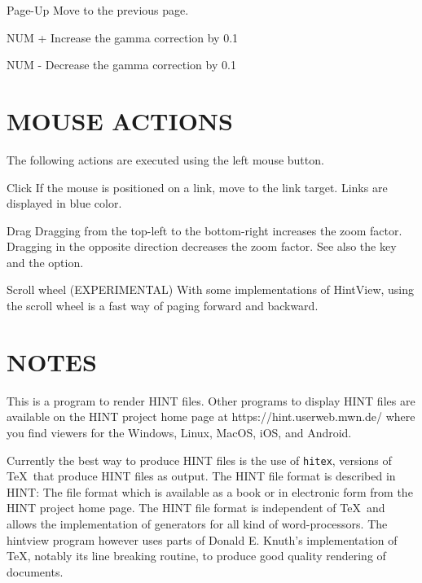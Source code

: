 \item{Page-Up}
              Move to the previous page.

\item{NUM +}  Increase the gamma correction by 0.1

\item{NUM -}  Decrease the gamma correction by 0.1
  
\enditemize


\section{MOUSE ACTIONS}
       The following actions are executed using the left mouse button.

\itemize
         
\item{Click}  If the mouse is positioned on a link, move to the  link  target.
              Links are displayed in blue color.

\item{Drag}   Dragging  from  the  top-left  to the bottom-right increases the
              zoom factor.  Dragging in the opposite direction  decreases  the
              zoom factor. See also the  key and the  option.

\item{Scroll} wheel (EXPERIMENTAL) With some implementations of HintView,
              using the scroll wheel is a fast way of paging forward and backward.
              
\enditemize

              
\section{NOTES}
       This is a program to render HINT files. Other  programs  to
       display  HINT  files  are  available  on  the HINT project home page at
       https://hint.userweb.mwn.de/ where you find viewers for the Windows,
       Linux, MacOS, iOS, and  Android.

       Currently  the  best  way to produce HINT files is the use of {\tt hitex},
       versions of \TeX\ that produce HINT files as  output.  The  HINT
       file format is described in HINT: The file format which is available as
       a book or in electronic form from the HINT project home page. The  HINT
       file format is independent of \TeX\ and allows the implementation of
       generators for all kind of word-processors. The hintview  program  however
       uses parts of Donald E. Knuth's implementation of \TeX, notably its line
       breaking routine, to produce good quality rendering of documents.

